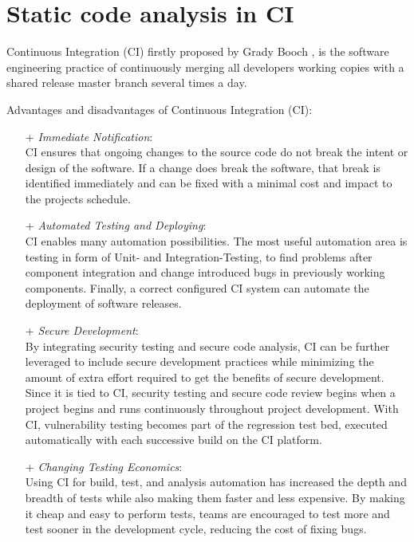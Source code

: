 \documentclass[conference]{IEEEtran}
\begin{document}
\section{Static code analysis in CI}
\label{sec:static_code_analysis_ci}
Continuous Integration (CI) firstly proposed by Grady Booch \cite{CI-Definition:Booch:1993}, is the software engineering practice of continuously merging all developers working copies with a shared release master branch several times a day.

Advantages and disadvantages of Continuous Integration (CI)\cite{SecurityinCI}:
\begin{itemize}
	\item[+] \textit{Immediate Notification}:\\
	CI ensures that ongoing changes to the source code do not break the intent or design of the software. If a change does break the software, that break is identified immediately and can be fixed with a minimal cost and impact to the projects schedule.
	\item[+] \textit{Automated Testing and Deploying}:\\
	CI enables many automation possibilities. The most useful automation area is testing in form of Unit- and Integration-Testing, to find problems after component integration and change introduced bugs in previously working components. 
	Finally, a correct configured CI system can automate the deployment of software releases. 
	\item[+] \textit{Secure Development}:\\
	By integrating security testing and secure code analysis, CI can be further leveraged to include secure development practices while minimizing the amount of extra effort required to get the benefits of secure development. Since it is tied to CI,
	security testing and secure code review begins when a project begins and runs continuously
	throughout project development. With CI, vulnerability testing becomes part of the regression test bed, executed automatically with each successive build on the CI platform.
	
	\item[+] \textit{Changing Testing Economics}:\\
	Using CI for build, test, and analysis automation has increased the depth and breadth of tests while also making them faster and less expensive. By making it cheap and easy to perform tests, teams are encouraged to test more and test sooner in the development cycle, reducing the cost of fixing bugs.
	

\end{itemize}
\end{document}
